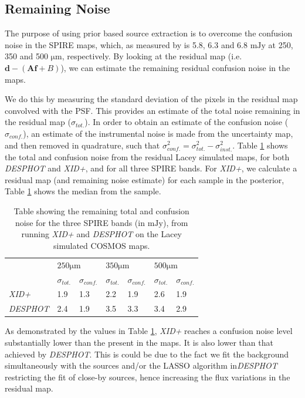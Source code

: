 \documentclass[useAMS,usenatbib]{mnras}
\begin{document}
\subsection{Remaining Noise}
The purpose of using prior based source extraction is to overcome the confusion noise in the SPIRE maps, which, as measured by \cite{Nguyen:2010} is 5.8, 6.3 and 6.8 $\mathrm{mJy}$ at 250, 350 and 500 $\mathrm{\mu m}$, respectively. By looking at the residual map (i.e. $\mathbf{d}-(\mathbf{Af}+B)$), we can estimate the remaining residual confusion noise in the maps.

We do this by measuring the standard deviation of the pixels in the residual map convolved with the PSF. This provides an estimate of the total noise remaining in the residual map ($\sigma_{tot.}$). In order to obtain an estimate of the confusion noise ($\sigma_{conf.}$), an estimate of the instrumental noise is made from the uncertainty map, and then removed in quadrature, such that $\sigma_{conf.}^2 = \sigma_{tot.}^2 - \sigma_{inst.}^2$. Table \ref{tab:remaining_noise} shows the total and confusion noise from the residual Lacey simulated maps, for both \emph{DESPHOT} and \emph{XID+}, and for all three SPIRE bands. For \emph{XID+}, we calculate a residual map (and remaining noise estimate) for each sample in the posterior, Table \ref{tab:remaining_noise} shows the median from the sample.

\begin{table}
\centering
\begin{tabular}{l|l|l|l|l|l|l|}
\cline{2-7}
                                       & \multicolumn{2}{l|}{$250\mathrm{\mu m}$} & \multicolumn{2}{l|}{$350\mathrm{\mu m}$} & \multicolumn{2}{l|}{$500\mathrm{\mu m}$} \\ \cline{2-7} 
                                       & $\sigma_{tot.}$     & $\sigma_{conf.}$    & $\sigma_{tot.}$    & $\sigma_{conf.}$    & $\sigma_{tot.}$   & $\sigma_{conf.}$    \\ \hline
\multicolumn{1}{|l|}{\emph{XID+}}    & 1.9                   & 1.3                   & 2.2                   &  1.9                   & 2.6                   &  1.9                   \\ \hline
\multicolumn{1}{|l|}{\emph{DESPHOT}} & 2.4                   & 1.9                 & 3.5                  &  3.3                 &  3.4                  &  2.9                   \\ \hline
\end{tabular}
\caption{Table showing the remaining total and confusion noise for the three SPIRE bands (in $\mathrm{mJy}$), from running \emph{XID+} and \emph{DESPHOT} on the Lacey simulated COSMOS maps.}
\label{tab:remaining_noise}
\end{table}
As demonstrated by the values in Table \ref{tab:remaining_noise}, \emph{XID+} reaches a confusion noise level substantially lower than the present in the maps. It is also lower than that achieved by \emph{DESPHOT}. This is could be due to the fact we fit the background simultaneously with the sources and/or the LASSO algorithm in\emph{DESPHOT} restricting the fit of close-by sources, hence increasing the flux variations in the residual map. 
 
\end{document}
